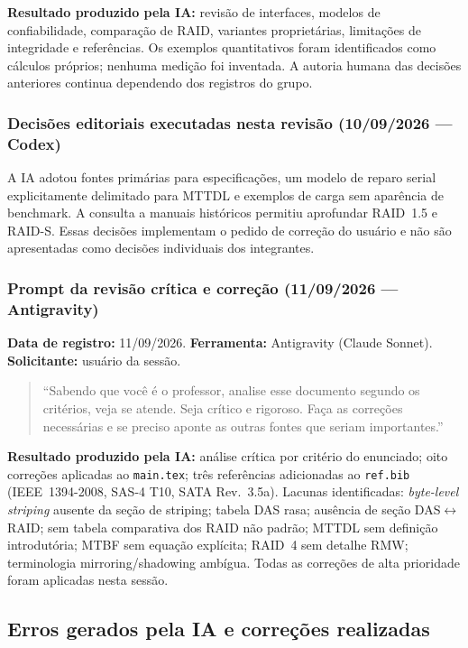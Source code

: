 \documentclass[titlepage]{article}
\begin{document}
\noindent\textbf{Resultado produzido pela IA:} revisão de interfaces, modelos de confiabilidade, comparação de RAID, variantes proprietárias, limitações de integridade e referências. Os exemplos quantitativos foram identificados como cálculos próprios; nenhuma medição foi inventada. A autoria humana das decisões anteriores continua dependendo dos registros do grupo.

\subsubsection{Decisões editoriais executadas nesta revisão (10/09/2026 — Codex)}
A IA adotou fontes primárias para especificações, um modelo de reparo serial explicitamente delimitado para MTTDL e exemplos de carga sem aparência de benchmark. A consulta a manuais históricos permitiu aprofundar RAID~1.5 e RAID-S. Essas decisões implementam o pedido de correção do usuário e não são apresentadas como decisões individuais dos integrantes.

\subsubsection{Prompt da revisão crítica e correção (11/09/2026 — Antigravity)}
\noindent\textbf{Data de registro:} 11/09/2026. \textbf{Ferramenta:} Antigravity (Claude Sonnet). \textbf{Solicitante:} usuário da sessão.
\begin{quote}\small
``Sabendo que você é o professor, analise esse documento segundo os critérios, veja se atende. Seja crítico e rigoroso. Faça as correções necessárias e se preciso aponte as outras fontes que seriam importantes.''
\end{quote}
\noindent\textbf{Resultado produzido pela IA:} análise crítica por critério do enunciado; oito correções aplicadas ao \texttt{main.tex}; três referências adicionadas ao \texttt{ref.bib} (IEEE~1394-2008, SAS-4 T10, SATA Rev.~3.5a). Lacunas identificadas: \textit{byte-level striping} ausente da seção de striping; tabela DAS rasa; ausência de seção DAS$\leftrightarrow$RAID; sem tabela comparativa dos RAID não padrão; MTTDL sem definição introdutória; MTBF sem equação explícita; RAID~4 sem detalhe RMW; terminologia mirroring/shadowing ambígua. Todas as correções de alta prioridade foram aplicadas nesta sessão.

\newpage
\subsection{Erros gerados pela IA e correções realizadas}
\end{document}
